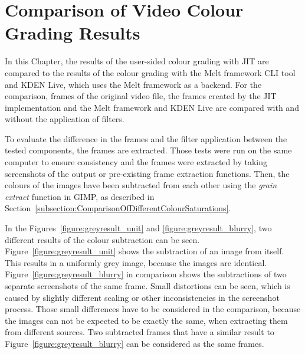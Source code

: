 \documentclass[../MasterThesis.tex]{subfiles}
\begin{document}
	
	
%
%
%
%
%
%
%
%
\newpage
\section{Comparison of Video Colour Grading Results} \label{section:experimentalevaluationanddiscussion}  


In this Chapter, the results of the user-sided colour grading with JIT are compared to the results of the colour grading with the Melt framework CLI tool and KDEN Live, which uses the Melt framework as a backend. For the comparison, frames of the original video file, the frames created by the JIT implementation and the Melt framework and KDEN Live are compared with and without the application of filters.


To evaluate the difference in the frames and the filter application between the tested components, the frames are extracted. Those tests were run on the same computer to ensure consistency and the frames were extracted by taking screenshots of the output or pre-existing frame extraction functions.
Then, the colours of the images have been subtracted from each other using the \textit{grain extract} function in GIMP, as described in Section~\ref{subsection:ComparisonOfDifferentColourSaturations}.


In the Figures~\ref{figure:greyresult_unit} and \ref{figure:greyresult_blurry}, two different results of the colour subtraction can be seen. 
%
Figure~\ref{figure:greyresult_unit} shows the subtraction of an image from itself. This results in a uniformly grey image, because the images are identical. Figure~\ref{figure:greyresult_blurry} in comparison shows the subtractions of two separate screenshots of the same frame. Small distortions can be seen, which is caused by slightly different scaling or other inconsistencies in the screenshot process. Those small differences have to be considered in the comparison, because the images can not be expected to be exactly the same, when extracting them from different sources. Two subtracted frames that have a similar result to Figure~\ref{figure:greyresult_blurry} can be considered as the same frames.
\end{document}
